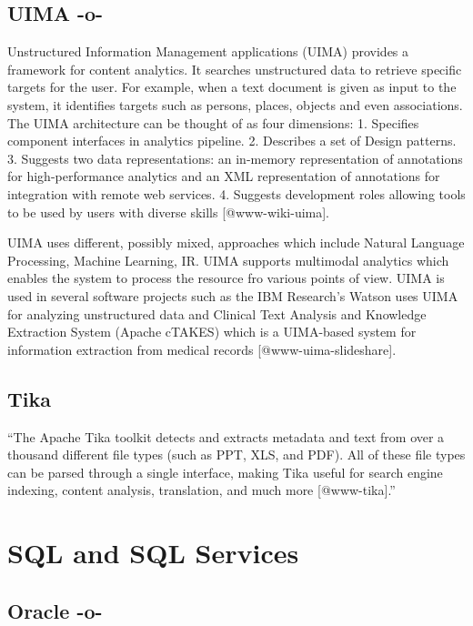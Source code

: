 \subsection{UIMA -o-}

Unstructured Information Management applications (UIMA) provides a
framework for content analytics. It searches unstructured data to
retrieve specific targets for the user. For example, when a text
document is given as input to the system, it identifies targets such
as persons, places, objects and even associations. The UIMA
architecture can be thought of as four dimensions: 1. Specifies
component interfaces in analytics pipeline.  2. Describes a set of
Design patterns. 3. Suggests two data representations: an in-memory
representation of annotations for high-performance analytics and an
XML representation of annotations for integration with remote web
services. 4. Suggests development roles allowing tools to be used by
users with diverse skills [@www-wiki-uima].

UIMA uses different, possibly mixed, approaches which include Natural
Language Processing, Machine Learning, IR. UIMA supports multimodal
analytics which enables the system to process the resource fro various
points of view. UIMA is used in several software projects such as the
IBM Research's Watson uses UIMA for analyzing unstructured data and
Clinical Text Analysis and Knowledge Extraction System (Apache cTAKES)
which is a UIMA-based system for information extraction from medical
records [@www-uima-slideshare].


     
\subsection{Tika}

``The Apache Tika toolkit detects and extracts metadata and text from
over a thousand different file types (such as PPT, XLS, and PDF). All
of these file types can be parsed through a single interface, making
Tika useful for search engine indexing, content analysis, translation,
and much more [@www-tika].''


\section{SQL and SQL Services}

\subsection{Oracle -o-}

